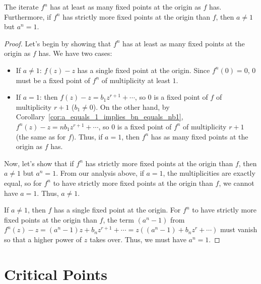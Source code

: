\begin{corollary}
    \label{cor:fn_has_at_least_as_many_fixed_points_as_f}
    The iterate $f^n$ has at least as many fixed points at the origin as $f$
    has. Furthermore, if $f^n$ has strictly more fixed points at the origin than
    $f$, then $a \neq 1$ but $a^n = 1$.
\end{corollary}
\begin{proof}
    Let's begin by showing that $f^n$ has at least as many fixed points at the
    origin as $f$ has. We have two cases:
    \begin{itemize}
        \item If $a \neq 1$: $f(z) - z$ has a single fixed point at the origin.
        Since $f^n(0) = 0$, $0$ must be a fixed point of $f^n$ of multiplicity
        at least $1$.
        \item If $a = 1$: then $f(z) - z = b_1 z^{r+1} + \cdots$, so $0$ is a
        fixed point of $f$ of multiplicity $r + 1$ ($b_1 \neq 0$). On the other
        hand, by Corollary~\ref{cor:a_equals_1_implies_bn_equals_nb1}, $f^n(z) -
        z = n b_1 z^{r+1} + \cdots$, so $0$ is a fixed point of $f^n$ of
        multiplicity $r + 1$ (the same as for $f$). Thus, if $a = 1$, then $f^n$
        has as many fixed points at the origin as $f$ has.
    \end{itemize}

    Now, let's show that if $f^n$ has strictly more fixed points at the origin
    than $f$, then $a \neq 1$ but $a^n = 1$. From our analysis above, if $a =
    1$, the multiplicities are exactly equal, so for $f^n$ to have strictly more
    fixed points at the origin than $f$, we cannot have $a = 1$. Thus, $a \neq
    1$.

    If $a \neq 1$, then $f$ has a single fixed point at the origin. For $f^n$ to
    have strictly more fixed points at the origin than $f$, the term $(a^n - 1)$
    from $f^n(z) - z = (a^n - 1)z + b_n z^{r+1} + \cdots = z((a^n - 1) + b_n z^r
    + \cdots)$ must vanish so that a higher power of $z$ takes over. Thus, we
    must have $a^n = 1$.
\end{proof}

\section{Critical Points}
\label{sec:critical_points}

